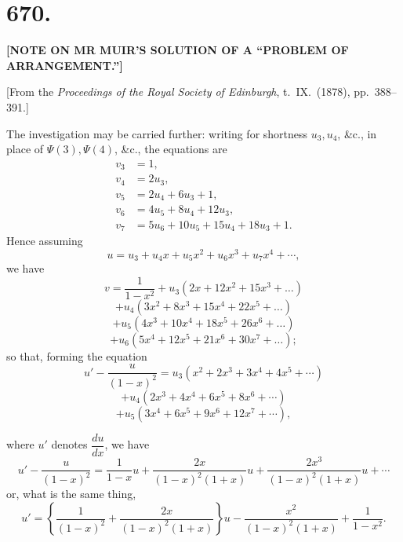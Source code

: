 \documentclass[11pt,a4paper]{article}
\begin{document}
\newpage



\section*{670.}

\begin{center}
\textbf{[NOTE ON MR MUIR'S SOLUTION OF A ``PROBLEM OF\\
ARRANGEMENT.'']}
\end{center}

\medskip

\begin{center}
[From the \emph{Proceedings of the Royal Society of Edinburgh}, t.~IX.\ (1878), pp.~388--391.]
\end{center}

\medskip

\noindent The investigation may be carried further: writing for shortness $u_{3}, u_{4}$, \&c., in place of $\Psi(3), \Psi(4)$, \&c., the equations are
\begin{align*}
v_{3} &= 1,\\
v_{4} &= 2u_{3},\\
v_{5} &= 2u_{4} + 6u_{3} + 1,\\
v_{6} &= 4u_{5} + 8u_{4} + 12u_{3},\\
v_{7} &= 5u_{6} + 10u_{5} + 15u_{4} + 18u_{3} + 1.
\end{align*}
Hence assuming
\[
u = u_{3} + u_{4}x + u_{5}x^{2} + u_{6}x^{3} + u_{7}x^{4} + \cdots,
\]
we have
\[
v = \frac{1}{1 - x^{2}} + u_{3}(2x + 12x^{2} + 15x^{3} + \ldots)
\]
\[
+ u_{4}(3x^{2} + 8x^{3} + 15x^{4} + 22x^{5} + \ldots)
\]
\[
+ u_{5}(4x^{3} + 10x^{4} + 18x^{5} + 26x^{6} + \ldots)
\]
\[
+ u_{6}(5x^{4} + 12x^{5} + 21x^{6} + 30x^{7} + \ldots);
\]
so that, forming the equation
\[
u' - \frac{u}{(1 - x)^{2}} = u_{3}(x^{2} + 2x^{3} + 3x^{4} + 4x^{5} + \cdots)
\]
\[
+ u_{4}(2x^{3} + 4x^{4} + 6x^{5} + 8x^{6} + \cdots)
\]
\[
+ u_{5}(3x^{4} + 6x^{5} + 9x^{6} + 12x^{7} + \cdots),
\]

\newpage


\noindent where $u'$ denotes $\dfrac{du}{dx}$, we have
\[
u' - \frac{u}{(1 - x)^{2}} = \frac{1}{1 - x}u + \frac{2x}{(1 - x)^{2}(1 + x)}u + \frac{2x^{3}}{(1 - x)^{2}(1 + x)}u + \cdots
\]
or, what is the same thing,
\[
u' = \left\{\frac{1}{(1 - x)^{2}} + \frac{2x}{(1 - x)^{2}(1 + x)}\right\}u - \frac{x^{2}}{(1 - x)^{2}(1 + x)} + \frac{1}{1 - x^{2}}.
\]
\end{document}

